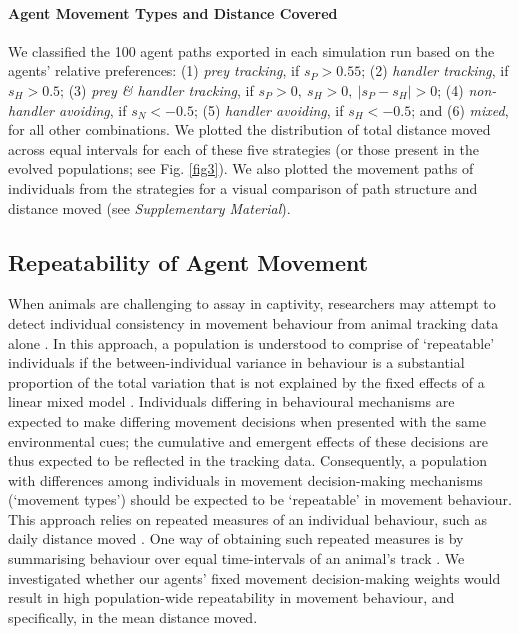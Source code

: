     \paragraph{Agent Movement Types and Distance Covered}
    
    We classified the 100 agent paths exported in each simulation run based on the agents' relative preferences: (1) \textit{prey tracking}, if $s_P > 0.55$; (2) \textit{handler tracking}, if $s_H > 0.5$; (3) \textit{prey \& handler tracking}, if $s_P > 0,~s_H > 0,~|s_P - s_H| > 0$; (4) \textit{non-handler avoiding}, if $s_N < -0.5$; (5) \textit{handler avoiding}, if $s_H < -0.5$; and (6) \textit{mixed}, for all other combinations.
    We plotted the distribution of total distance moved across equal intervals for each of these five strategies (or those present in the evolved populations; see Fig. \ref{fig3}).
    We also plotted the movement paths of individuals from the strategies for a visual comparison of path structure and distance moved (see \textit{Supplementary Material}).
    
    \subsection*{Repeatability of Agent Movement}
    
    When animals are challenging to assay in captivity, researchers may attempt to detect individual consistency in movement behaviour from animal tracking data alone \citep[see a review in][see \citealt{hertel2019} for an example]{hertel2020}.
    In this approach, a population is understood to comprise of `repeatable' individuals if the between-individual variance in behaviour is a substantial proportion of the total variation that is not explained by the fixed effects of a linear mixed model \citep[LMM][]{hertel2019}.
    Individuals differing in behavioural mechanisms are expected to make differing movement decisions when presented with the same environmental cues; the cumulative and emergent effects of these decisions are thus expected to be reflected in the tracking data.
    Consequently, a population with differences among individuals in movement decision-making mechanisms (`movement types') should be expected to be `repeatable' in movement behaviour.
    This approach relies on repeated measures of an individual behaviour, such as daily distance moved \citep[][]{niemela2018, hertel2020}.
    One way of obtaining such repeated measures is by summarising behaviour over equal time-intervals of an animal's track \citep[see e.g.][]{hertel2019}.
    We investigated whether our agents' fixed movement decision-making weights would result in high population-wide repeatability in movement behaviour, and specifically, in the mean distance moved.
    
